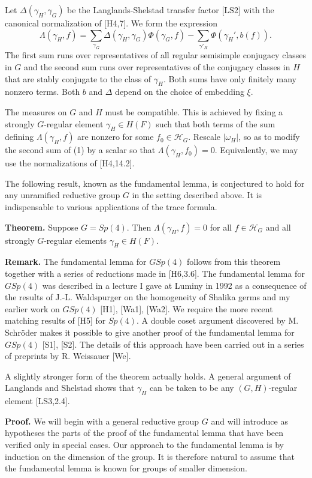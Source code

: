 \documentclass{amsart}
\newcommand\cH{{\mathcal H}}
\begin{document}
Let $\Delta(\gamma_H,\gamma_G)$ be the Langlands-Shelstad transfer
factor [LS2] with the canonical normalization of [H4,7].
We form the expression
\begin{equation}
\Lambda(\gamma_H,f) = \sum_{\gamma_G}\Delta(\gamma_H,\gamma_G)
\Phi(\gamma_G,f) - \sum_{\gamma'_H} \Phi(\gamma_H',b(f)). %
\end{equation}
The first sum runs over representatives of all regular
semisimple conjugacy classes in $G$ and the second sum runs
over representatives of the conjugacy classes in $H$ that are
stably conjugate to the class of $\gamma_H$.  Both sums have
only finitely many nonzero terms.  Both $b$ and $\Delta$ depend
on the choice of embedding $\xi$.

The measures on $G$ and $H$ must be compatible. This is
achieved by fixing a
strongly $G$-regular element $\gamma_H\in H(F)$ such that both
terms of the sum defining $\Lambda(\gamma_H,f)$ are nonzero for
some $f_0\in \cH_G$.  Rescale $|\omega_H|$, so as to modify the
second sum of 
(1) by a scalar so that $\Lambda(\gamma_H,f_0)=0$.  Equivalently, 
we may use the normalizations of [H4,14.2].

The following result, known as the fundamental lemma, is conjectured
to hold for any unramified 
reductive group $G$ in the setting described above.  
It is indispensable
to various applications of the trace formula. 

{\bf Theorem.}  Suppose $G = Sp(4)$.  Then $\Lambda(\gamma_H,f)=0$
for all $f\in \cH_G$ and all strongly $G$-regular elements $\gamma_H\in H(F)$.

{\bf Remark.}  The fundamental lemma for $GSp(4)$ follows from this
theorem together with a series of reductions made in [H6,3.6].
  The fundamental lemma for $GSp(4)$
was described in a lecture 
I gave at Luminy in 1992 as a consequence of the
results of J.-L.
Waldspurger on the homogeneity of Shalika germs and
my earlier work on $GSp(4)$ [H1], [Wa1], [Wa2].  We require
the more recent matching results of [H5] for $Sp(4)$.
A double coset argument discovered by M. Schr\"oder makes
it possible to give another proof of the fundamental lemma
for $GSp(4)$ [S1], [S2].  The details of this approach have been
carried out in a series of preprints by R. Weissauer [We].

A slightly stronger form of the theorem actually holds.
A general argument of Langlands and Shelstad shows that
$\gamma_H$ can be taken to be any $(G,H)$-regular element
[LS3,2.4].

{\bf Proof.}  We will begin with a general reductive group $G$ and
will introduce as hypotheses the parts of the proof of the fundamental
lemma that have been verified only in special cases.  Our approach
to the fundamental lemma is by induction on the dimension
of the group.  It
is therefore natural to assume that the fundamental
lemma is known for groups of smaller dimension.
\end{document}
